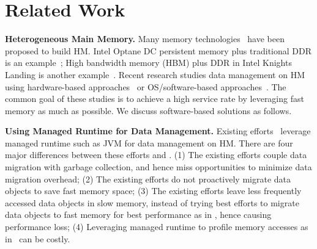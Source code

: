 \section{Related Work}
\textbf{Heterogeneous Main Memory.}
Many memory technologies~\cite{6509675,3DXPoint_intel,Optane:intelweb,ieeemicro10:lee} have been proposed to build HM. Intel Optane DC persistent memory plus traditional DDR is an example~\cite{8641463,optane:ucsd}; High bandwidth memory (HBM) plus DDR in Intel Knights Landing is another example~\cite{6509675}. Recent research studies data management on HM using hardware-based approaches~\cite{asplos15:agarwal,hetero_mem_arch,qureshi_micro09, ibm_isca09,gpu_pcm_pact13,hpdc16:wu,row_buffer_pcm_iccd12, Ramos:ics11} or OS/software-based approaches~\cite{eurosys16:dulloor,nas16:giardino,asplos16:lin,Narayan:IPDPS2018,Peng:ISMM17,ismm16:shen,sc18:wu,wen:ICS18,unimem:sc17,Yan:ASPLOS19,Yu:ics17}. The common goal of these studies is to achieve a high service rate by leveraging fast memory as much as possible. We discuss software-based solutions as follows.

\textbf{Using Managed Runtime for Data Management. }%
Existing efforts~\cite{pldi19:panthera, pldi18:KG,ASPLOS18:Espresso,sigmetrics19:crystalgazer} leverage managed runtime such as JVM for data management on HM. There are four major differences between these efforts and \name. (1) The existing efforts couple data migration with garbage collection, and hence miss opportunities to minimize data migration overhead; (2) The existing efforts do not proactively migrate data objects to save fast memory space; (3) The existing efforts leave less frequently accessed data objects in slow memory, instead of trying best efforts to migrate data objects to fast memory for best performance as in \name, hence causing performance loss; (4) Leveraging managed runtime to profile memory accesses as in~\cite{pldi19:panthera, pldi18:KG} can be costly.

